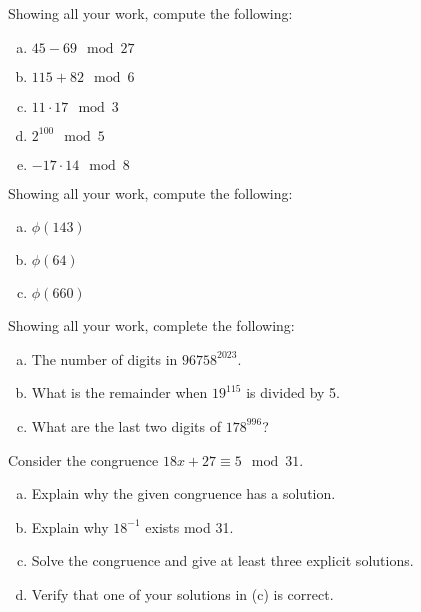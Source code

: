 \documentclass[11pt,letterpaper]{article}
\begin{document}

 Showing all your work, compute the following:
	\begin{enumerate}[(a)]
	\item $45 - 69 \mod 27$
	\item $115 + 82 \mod 6$
	\item $11 \cdot 17 \mod 3$
	\item $2^{100} \mod 5$
	\item $-17 \cdot 14 \mod 8$
	\end{enumerate}



\newpage



 Showing all your work, compute the following:
	\begin{enumerate}[(a)]
	\item $\phi(143)$
	\item $\phi(64)$
	\item $\phi(660)$
	\end{enumerate}



\newpage



 Showing all your work, complete the following:
	\begin{enumerate}[(a)]
	\item The number of digits in $96758^{2023}$.
	\item What is the remainder when $19^{115}$ is divided by 5.
	\item What are the last two digits of $178^{996}$?
	\end{enumerate}



\newpage



 Consider the congruence $18x + 27 \equiv 5 \mod 31$. 
	\begin{enumerate}[(a)]
	\item Explain why the given congruence has a solution. 
	\item Explain why $18^{-1}$ exists mod 31. 
	\item Solve the congruence and give at least three explicit solutions. 
	\item Verify that one of your solutions in (c) is correct. 
	\end{enumerate}
\end{document}
